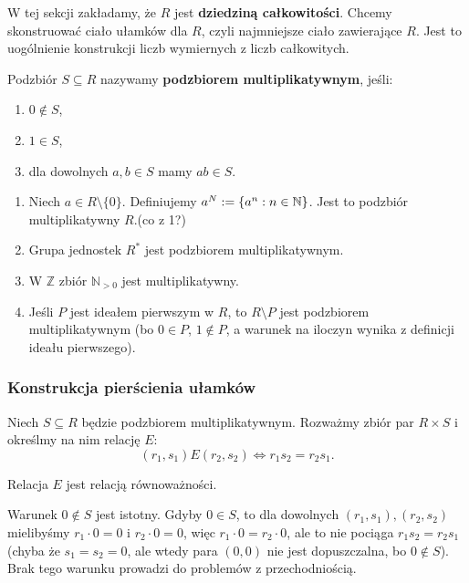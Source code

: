 \begin{context}
W tej sekcji zakładamy, że $R$ jest \textbf{dziedziną całkowitości}. Chcemy skonstruować ciało ułamków dla $R$, czyli najmniejsze ciało zawierające $R$. Jest to uogólnienie konstrukcji liczb wymiernych z liczb całkowitych.
\end{context}

\begin{definition}
Podzbiór $S \subseteq R$ nazywamy \textbf{podzbiorem multiplikatywnym}, jeśli:
\begin{enumerate}[label=\arabic*)]
    \item $0 \notin S$,
    \item $1 \in S$,
    \item dla dowolnych $a, b \in S$ mamy $ab \in S$.
\end{enumerate}
\end{definition}

\begin{eg}
\begin{enumerate}[label=\arabic*)]
    \item Niech $a \in R \setminus \{0\}$. Definiujemy $a^{N} := \{a^{n}: n \in \mathbb{N}\}$. Jest to podzbiór multiplikatywny $R$.(co z 1?)
    \item Grupa jednostek $R^*$ jest podzbiorem multiplikatywnym.
    \item W $\mathbb{Z}$ zbiór $\mathbb{N}_{>0}$ jest multiplikatywny.
    \item Jeśli $P$ jest ideałem pierwszym w $R$, to $R \setminus P$ jest podzbiorem multiplikatywnym (bo $0 \in P$, $1 \notin P$, a warunek na iloczyn wynika z definicji ideału pierwszego).
\end{enumerate}
\end{eg}

\subsubsection*{Konstrukcja pierścienia ułamków}

Niech $S \subseteq R$ będzie podzbiorem multiplikatywnym. Rozważmy zbiór par $R \times S$ i określmy na nim relację $E$:
\[
(r_1, s_1) E (r_2, s_2) \iff r_1 s_2 = r_2 s_1.
\]

\begin{fact}
Relacja $E$ jest relacją równoważności.
\end{fact}

\begin{remark}
Warunek $0 \notin S$ jest istotny. Gdyby $0 \in S$, to dla dowolnych $(r_1, s_1), (r_2, s_2)$ mielibyśmy $r_1 \cdot 0 = 0$ i $r_2 \cdot 0 = 0$, więc $r_1 \cdot 0 = r_2 \cdot 0$, ale to nie pociąga $r_1 s_2 = r_2 s_1$ (chyba że $s_1 = s_2 = 0$, ale wtedy para $(0,0)$ nie jest dopuszczalna, bo $0 \notin S$). Brak tego warunku prowadzi do problemów z przechodniością.
\end{remark}

